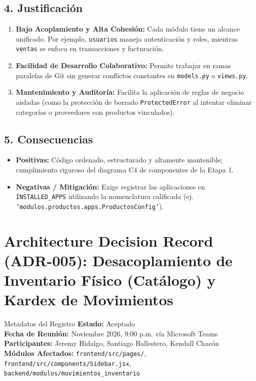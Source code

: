 \documentclass[11pt,a4paper]{article}
\begin{document}
\subsection{4. Justificación}
\begin{enumerate}
    \item \textbf{Bajo Acoplamiento y Alta Cohesión:} Cada módulo tiene un alcance unificado. Por ejemplo, \texttt{usuarios} maneja autenticación y roles, mientras \texttt{ventas} se enfoca en transacciones y facturación.
    \item \textbf{Facilidad de Desarrollo Colaborativo:} Permite trabajar en ramas paralelas de Git sin generar conflictos constantes en \texttt{models.py} o \texttt{views.py}.
    \item \textbf{Mantenimiento y Auditoría:} Facilita la aplicación de reglas de negocio aisladas (como la protección de borrado \texttt{ProtectedError} al intentar eliminar categorías o proveedores con productos vinculados).
\end{enumerate}

\subsection{5. Consecuencias}
\begin{itemize}[leftmargin=*]
    \item \textbf{Positivas:} Código ordenado, estructurado y altamente mantenible; cumplimiento riguroso del diagrama C4 de componentes de la Etapa 1.
    \item \textbf{Negativas / Mitigación:} Exige registrar las aplicaciones en \texttt{INSTALLED\_APPS} utilizando la nomenclatura calificada (ej. \texttt{'modulos.productos.apps.ProductosConfig'}).
\end{itemize}

\newpage

\section{Architecture Decision Record (ADR-005): Desacoplamiento de Inventario Físico (Catálogo) y Kardex de Movimientos}

\begin{adrbox}{Metadatos del Registro}
\textbf{Estado:} Aceptado \\
\textbf{Fecha de Reunión:} Noviembre 2026, 9:00 p.m. vía Microsoft Teams \\
\textbf{Participantes:} Jeremy Hidalgo, Santiago Ballestero, Kendall Chacón \\
\textbf{Módulos Afectados:} \texttt{frontend/src/pages/}, \texttt{frontend/src/components/Sidebar.jsx}, \texttt{backend/modulos/movimientos\_inventario}
\end{adrbox}
\end{document}
